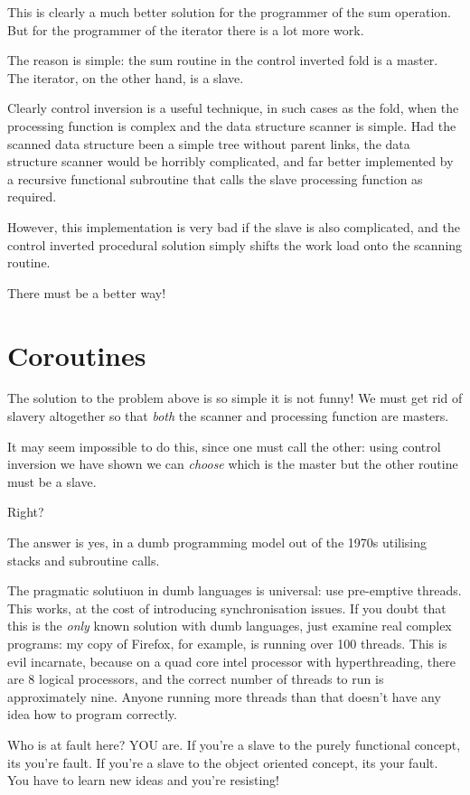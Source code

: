\documentclass{article}
\begin{document}
This is clearly a much better solution for the programmer
of the sum operation. But for the programmer of the iterator
there is a lot more work.

The reason is simple: the sum routine in the control inverted
fold is a master. The iterator, on the other hand, is a slave.

Clearly control inversion is a useful technique, in such cases
as the fold, when the processing function is complex and the
data structure scanner is simple. Had the scanned data structure
been a simple tree without parent links, the data structure
scanner would be horribly complicated, and far better implemented
by a recursive functional subroutine that calls the slave
processing function as required. 

However, this implementation
is very bad if the slave is also complicated, 
and the control inverted procedural solution simply
shifts the work load onto the scanning routine.

There must be a better way!

\section{Coroutines}
The solution to the problem above is so simple it is not funny!
We must get rid of slavery altogether so that {\em both} the scanner
and processing function are masters.

It may seem impossible to do this, since one must call the
other: using control inversion we have shown we can {\em choose}
which is the master but the other routine must be a slave.

Right?

The answer is yes, in a dumb programming model out of the 1970s
utilising stacks and subroutine calls.

The pragmatic solutiuon in dumb languages is universal: use 
pre-emptive threads. This works, at the cost of introducing
synchronisation issues. If you doubt that this is the {\em only}
known solution with dumb languages, just examine real complex
programs: my copy of Firefox, for example, is running over 100
threads. This is evil incarnate, because on a quad core intel processor
with hyperthreading, there are 8 logical processors, and the correct
number of threads to run is approximately nine. Anyone running more
threads than that doesn't have any idea how to program correctly.

Who is at fault here? YOU are. If you're a slave to the purely
functional concept, its you're fault. If you're a slave to the
object oriented concept, its your fault. You have to learn new
ideas and you're resisting!
\end{document}

